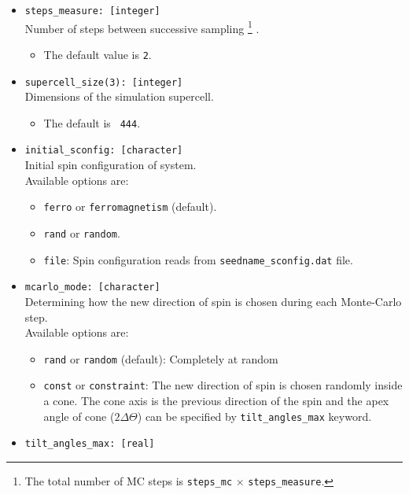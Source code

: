 \documentclass[10pt]{report}
\begin{document}
\begin{itemize}
\item {\tt steps\_measure: [integer]}                 \\
Number of steps between successive sampling
\footnote{The total number of MC steps is {\tt steps\_mc} $\times$ {\tt steps\_measure}.}
.
\begin{itemize} [label=\adfhalfrightarrowhead]
\item  The default value is {\tt 2}.     
\end{itemize}
\item {\tt supercell\_size(3): [integer]}                \\
Dimensions of the simulation supercell.
\begin{itemize} [label=\adfhalfrightarrowhead]
\item  The default is {\tt\hspace{0.5cm} 4\hspace{1cm}4\hspace{1cm}4}.
\end{itemize}
\item {\tt initial\_sconfig: [character]}             \\
Initial spin configuration of system.\\
Available options are:
\begin{itemize} [label=\adfhalfrightarrowhead]
\item  {\tt ferro} or {\tt ferromagnetism} (default).
\item  {\tt rand} or {\tt random}.
\item  {\tt file}: Spin configuration reads from {\tt seedname\_sconfig.dat} file.
\end{itemize}
\item {\tt mcarlo\_mode: [character]}                 \\
Determining how the new direction of spin is chosen during each Monte-Carlo step.\\
Available options are:
\begin{itemize} [label=\adfhalfrightarrowhead]
\item  {\tt rand} or {\tt random} (default): Completely at random
\item  {\tt const} or {\tt constraint}: 
The new direction of spin is chosen randomly inside 
 a cone. The cone axis is the previous direction of the 
spin and the apex angle of cone  ($2\Delta\Theta$) can be specified by {\tt tilt\_angles\_max} keyword.
\end{itemize}
\item {\tt tilt\_angles\_max: [real]}               \\

\end{itemize}
\end{document}
